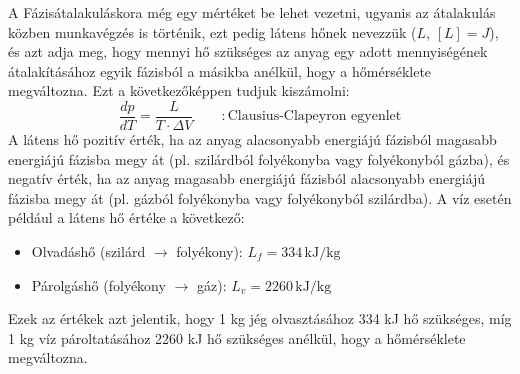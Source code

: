 \documentclass[a4paper,12pt]{article}
\begin{document}
A Fázisátalakuláskora még egy mértéket be lehet vezetni, ugyanis az átalakulás közben munkavégzés is történik, ezt pedig látens hőnek nevezzük ($L$, $\left[L\right] = J$), és azt adja meg, hogy
mennyi hő szükséges az anyag egy adott mennyiségének átalakításához egyik fázisból a másikba anélkül, hogy a hőmérséklete megváltozna.
Ezt a következőképpen tudjuk kiszámolni:
\begin{equation}
    \frac{dp}{dT} = \frac{L}{T \cdot \Delta V} \qquad : \text{Clausius-Clapeyron egyenlet}
\end{equation}
A látens hő pozitív érték, ha az anyag alacsonyabb energiájú fázisból magasabb energiájú fázisba megy át (pl. szilárdból folyékonyba vagy folyékonyból gázba),
és negatív érték, ha az anyag magasabb energiájú fázisból alacsonyabb energiájú fázisba megy át (pl. gázból folyékonyba vagy folyékonyból szilárdba). A víz esetén például
a látens hő értéke a következő:
\begin{itemize}
    \item Olvadáshő (szilárd $\to$ folyékony): $L_f = 334 \, \text{kJ/kg}$
    \item Párolgáshő (folyékony $\to$ gáz): $L_v = 2260 \, \text{kJ/kg}$
\end{itemize}
Ezek az értékek azt jelentik, hogy 1 kg jég olvasztásához 334 kJ hő szükséges, míg 1 kg víz pároltatásához 2260 kJ hő szükséges anélkül, hogy a hőmérséklete megváltozna.
\end{document}
